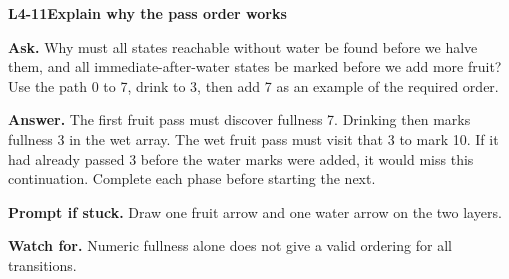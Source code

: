 \documentclass[11pt,a4paper]{article}
\begin{document}
\noindent\begin{minipage}{\textwidth}
{\color{teal}\textbf{L4-11}}\quad \textbf{Explain why the pass order works}\par\smallskip
\textbf{Ask.} Why must all states reachable without water be found before we halve them, and all immediate-after-water states be marked before we add more fruit? Use the path 0 to 7, drink to 3, then add 7 as an example of the required order.\par\smallskip
\textbf{Answer.} The first fruit pass must discover fullness 7. Drinking then marks fullness 3 in the wet array. The wet fruit pass must visit that 3 to mark 10. If it had already passed 3 before the water marks were added, it would miss this continuation. Complete each phase before starting the next.\par\smallskip
\textbf{Prompt if stuck.} Draw one fruit arrow and one water arrow on the two layers.\par\smallskip
\textbf{Watch for.} Numeric fullness alone does not give a valid ordering for all transitions.
\end{minipage}\par{}\medskip
\end{document}
